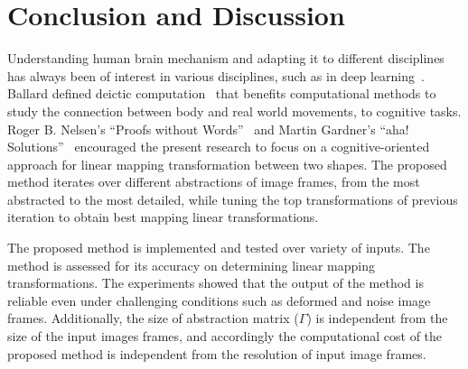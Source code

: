 \section{Conclusion and Discussion}
Understanding human brain mechanism and adapting it to different disciplines has always been of interest in various disciplines, such as in deep learning~\cite{hinton2007learning,hinton2006fast}. Ballard defined deictic computation~\cite{ballard1997deictic} that benefits computational methods to study the connection between body and real world movements, to cognitive tasks. Roger B. Nelsen’s ``Proofs without Words''~\cite{mackenzie1993proofs} and Martin Gardner’s ``aha! Solutions''~\cite{gardner1978aha} encouraged the present research to focus on a cognitive-oriented approach for linear mapping transformation between two shapes. The proposed method iterates over different abstractions of image frames, from the most abstracted to the most detailed, while tuning the top transformations of previous iteration to obtain best mapping linear transformations.

The proposed method is implemented and tested over variety of inputs. The method is assessed for its accuracy on determining linear mapping transformations. The experiments showed that the output of the method is reliable even under challenging conditions such as deformed and noise image frames. Additionally, the size of abstraction matrix ($\Gamma$) is independent from the size of the input images frames, and accordingly the computational cost of the proposed method is independent from the resolution of input image frames.